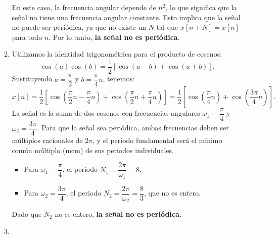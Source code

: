\begin{enumerate}[label=\color{red}\textbf{\arabic*)}]
\begin{enumerate}[label=\color{red}\textbf{\alph*)}]
            En este caso, la frecuencia angular depende de $n^2$, lo que significa que la señal no tiene una frecuencia angular constante. Esto implica que la señal no puede ser periódica, ya que no existe un $N$ tal que $x[n+N]=x[n]$ para todo $n$. Por lo tanto,  \textbf{la señal no es periódica}. 
        \item {} 

            Utilizamos la identidad trigonométrica para el producto de cosenos: \[
            \cos(a)\cos(b)=\dfrac{1}{2}\left[ \cos(a-b)+\cos(a+b) \right] .
            \] 
            Sustituyendo $a=\dfrac{\pi}{2}$ y $b=\dfrac{\pi}{4}n$, tenemos: \[
                x[n]=\dfrac{1}{2}\left[ \cos\left( \dfrac{\pi}{2}n-\dfrac{\pi}{4}n \right) +\cos\left( \dfrac{\pi}{2}n+\dfrac{\pi}{4}n \right)  \right] =\dfrac{1}{2}\left[ \cos\left( \dfrac{\pi}{4}n \right) +\cos\left( \dfrac{3\pi}{4}n \right)  \right] .
            \] 
            La señal es la suma de dos cosenos con frecuencias angulares $\omega_1=\dfrac{\pi}{4}$ y $\omega_2=\dfrac{3\pi}{4}$. Para que la señal sea periódica, ambas frecuencias deben ser múltiplos racionales de $2\pi$, y el periodo fundamental será el mínimo común múltiplo (mcm) de sus periodos individuales.
            \begin{itemize}[label=\textbullet]
                \item Para $\omega_1=\dfrac{\pi}{4}$, el periodo $N_1=\dfrac{2\pi}{\omega_1}=8$.
                \item Para $\omega_2=\dfrac{3\pi}{4}$, el periodo $N_2=\dfrac{2\pi}{\omega_2}=\dfrac{8}{3}$, que no es entero.
            \end{itemize}
            Dado que $N_2$ no es entero, \textbf{la señal no es periódica.} 
            
        \item {} 


\end{enumerate}
\end{enumerate}
